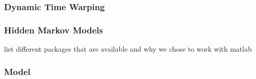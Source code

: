 \documentclass[a4paper, oneside]{csthesis}
\begin{document}


\subsubsection{Dynamic Time Warping}


\subsubsection{Hidden Markov Models}

list different packages that are available and why we chose to work with matlab

\subsubsection{Model}
\end{document}
